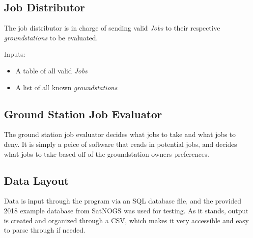 \documentclass{article}
\begin{document}
\subsection{Job Distributor}

The job distributor is in charge of sending valid \textit{Jobs} to their
respective \textit{groundstations} to be evaluated.

\noindent
Inputs:

\begin{itemize}
  \item A table of all valid \textit{Jobs}
  \item A list of all known \textit{groundstations}
\end{itemize}


\subsection{Ground Station Job Evaluator}

The ground station job evaluator decides what jobs to take and what jobs to
deny. It is simply a peice of software that reads in potential jobs, and
decides what jobs to take based off of the groundstation owners preferences.

\subsection{Data Layout}

Data is input through the program via an SQL database file, and the provided 2018 example database from SatNOGS was used for testing. As it stands, output is created and organized through a CSV, which makes it very accessible and easy to parse through if needed. 
\end{document}
